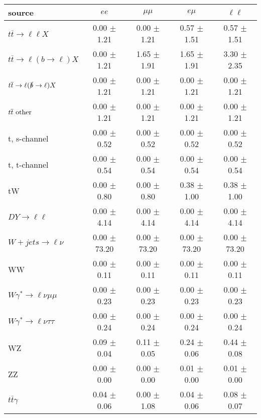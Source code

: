 \begin{tabular}{l|cccc} \hline\hline
source & $ee$ & $\mu\mu$ & $e\mu$ & $\ell\ell $ \\
\hline
$t\overline{t} \rightarrow \ell \ell X$ &  0.00 $\pm$  1.21 &  0.00 $\pm$  1.21 &  0.57 $\pm$  1.51 &  0.57 $\pm$  1.51 \\
$t\overline{t} \rightarrow \ell (b \rightarrow \ell) X$ &  0.00 $\pm$  1.21 &  1.65 $\pm$  1.91 &  1.65 $\pm$  1.91 &  3.30 $\pm$  2.35 \\
$t\overline{t} \rightarrow \ell (\slashed b \rightarrow \ell) X$ &  0.00 $\pm$  1.21 &  0.00 $\pm$  1.21 &  0.00 $\pm$  1.21 &  0.00 $\pm$  1.21 \\
        $t\overline{t}\ \rm{other}$ &  0.00 $\pm$  1.21 &  0.00 $\pm$  1.21 &  0.00 $\pm$  1.21 &  0.00 $\pm$  1.21 \\
\hline
                       t, s-channel &  0.00 $\pm$  0.52 &  0.00 $\pm$  0.52 &  0.00 $\pm$  0.52 &  0.00 $\pm$  0.52 \\
                       t, t-channel &  0.00 $\pm$  0.54 &  0.00 $\pm$  0.54 &  0.00 $\pm$  0.54 &  0.00 $\pm$  0.54 \\
                                 tW &  0.00 $\pm$  0.80 &  0.00 $\pm$  0.80 &  0.38 $\pm$  1.00 &  0.38 $\pm$  1.00 \\
\hline
         $DY \rightarrow \ell \ell$ &  0.00 $\pm$  4.14 &  0.00 $\pm$  4.14 &  0.00 $\pm$  4.14 &  0.00 $\pm$  4.14 \\
      $W+jets \rightarrow \ell \nu$ &  0.00 $\pm$ 73.20 &  0.00 $\pm$ 73.20 &  0.00 $\pm$ 73.20 &  0.00 $\pm$ 73.20 \\
                                 WW &  0.00 $\pm$  0.11 &  0.00 $\pm$  0.11 &  0.00 $\pm$  0.11 &  0.00 $\pm$  0.11 \\
\hline
$W\gamma^{*} \rightarrow \ell \nu \mu\mu$ &  0.00 $\pm$  0.23 &  0.00 $\pm$  0.23 &  0.00 $\pm$  0.23 &  0.00 $\pm$  0.23 \\
$W\gamma^{*} \rightarrow \ell \nu \tau\tau$ &  0.00 $\pm$  0.24 &  0.00 $\pm$  0.24 &  0.00 $\pm$  0.24 &  0.00 $\pm$  0.24 \\
                                 WZ &  0.09 $\pm$  0.04 &  0.11 $\pm$  0.05 &  0.24 $\pm$  0.06 &  0.44 $\pm$  0.08 \\
                                 ZZ &  0.00 $\pm$  0.00 &  0.00 $\pm$  0.00 &  0.01 $\pm$  0.00 &  0.01 $\pm$  0.00 \\
\hline
              $t\overline{t}\gamma$ &  0.04 $\pm$  0.06 &  0.00 $\pm$  1.08 &  0.04 $\pm$  0.06 &  0.08 $\pm$  0.07 \\

\end{tabular}
